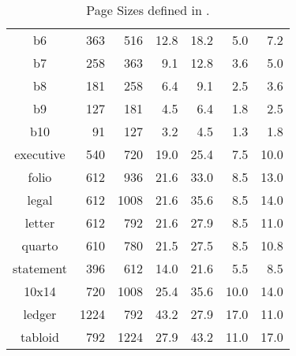 \begin{table}[!ht]
\begin{center}
{\begin{tabular}{|c||r|r||r|r||r|r|}
  b6          &  363 &  516 &  12.8 &  18.2 &   5.0 &   7.2 \\
  b7          &  258 &  363 &   9.1 &  12.8 &   3.6 &   5.0 \\
  b8          &  181 &  258 &   6.4 &   9.1 &   2.5 &   3.6 \\
  b9          &  127 &  181 &   4.5 &   6.4 &   1.8 &   2.5 \\
  b10         &   91 &  127 &   3.2 &   4.5 &   1.3 &   1.8 \\ \hline\hline
  executive   &  540 &  720 &  19.0 &  25.4 &   7.5 &  10.0 \\
  folio       &  612 &  936 &  21.6 &  33.0 &   8.5 &  13.0 \\
  legal       &  612 & 1008 &  21.6 &  35.6 &   8.5 &  14.0 \\
  letter      &  612 &  792 &  21.6 &  27.9 &   8.5 &  11.0 \\
  quarto      &  610 &  780 &  21.5 &  27.5 &   8.5 &  10.8 \\
  statement   &  396 &  612 &  14.0 &  21.6 &   5.5 &   8.5 \\ \hline\hline
  10x14       &  720 & 1008 &  25.4 &  35.6 &  10.0 &  14.0 \\
  ledger      & 1224 &  792 &  43.2 &  27.9 &  17.0 &  11.0 \\
  tabloid     &  792 & 1224 &  27.9 &  43.2 &  11.0 &  17.0 \\ \hline
 \end{tabular}
} %
\caption{\label{tbl:PageSztbl}Page Sizes defined in {\prog}.}\hspace{1cm}
\end{center}
\end{table}
\vfill
